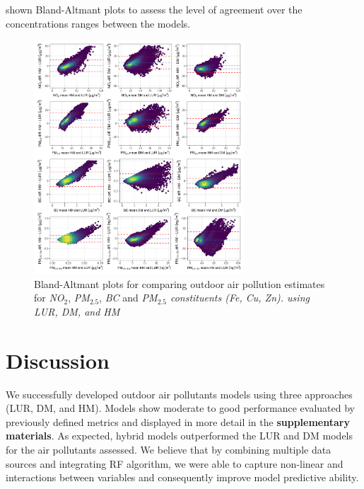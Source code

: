 \documentclass{article}
\begin{document}
\newpage


 shown Bland-Altmant plots to assess the level of agreement over the concentrations ranges between the models. 






\captionsetup[figure]{skip=6pt}
\begin{figure}[!h]
\includegraphics[width=0.7\textwidth]{figures/final_bland_altmant.png}
\caption{Bland-Altmant plots for comparing outdoor air pollution estimates for \textit{NO$_2$}, \textit{PM$_{2.5}$}, \textit{BC} and \textit{PM$_{2.5}$ constituents (Fe, Cu, Zn). using LUR, DM, and HM}}
\label{fig6}
\end{figure}


\newpage
\section{Discussion}
We successfully developed outdoor air pollutants models using three approaches (LUR, DM, and HM). Models show moderate to good performance 
evaluated by previously defined metrics and displayed in more detail in the \textbf{supplementary materials}. As expected, hybrid models outperformed the LUR and DM models for the air pollutants assessed. We believe that by combining multiple data sources and integrating RF algorithm, we were able to capture non-linear and interactions between variables and consequently improve model predictive ability. 
\end{document}
